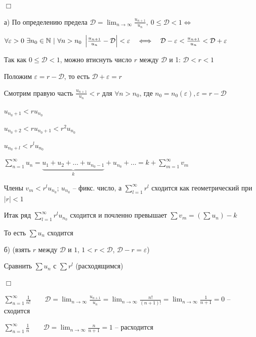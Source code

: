 \documentclass[12pt]{article}
\begin{document}
    \begin{MyProof}
        $\Box$

        а) По определению предела $\mathcal{D} = \lim_{n \to \infty} \frac{u_{n + 1}}{u_n}, \ 0 \leq \mathcal{D} < 1 \Longleftrightarrow$

        $\forall \varepsilon > 0 \ \exists n_0 \in \mathbb{N} \ | \ \forall n > n_0 \ \left|\frac{u_{n + 1}}{u_n} - \mathcal{D}\right| < \varepsilon \quad \Longleftrightarrow \quad \mathcal{D} - \varepsilon < \frac{u_{n + 1}}{u_n} < \mathcal{D} + \varepsilon$

        Так как $0 \leq \mathcal{D} < 1$, можно втиснуть число $r$ между $\mathcal{D}$ и 1: $\mathcal{D} < r < 1$

        Положим $\varepsilon = r - \mathcal{D}$, то есть $\mathcal{D} + \varepsilon = r$

        Смотрим правую часть $\frac{u_{n + 1}}{u_n} < r$ для $\forall n > n_0$, где $n_0 = n_0(\varepsilon), \varepsilon = r - \mathcal{D}$

        $u_{n_0 + 1} < r u_{n_0}$

        $u_{n_0 + 2} < r u_{n_0 + 1} < r^2 u_{n_0}$

        $u_{n_0 + l} < r^l u_{n_0}$

        $\sum_{n = 1}^\infty u_n = \underset{k}{\underbrace{u_1 + u_2 + \dots + u_{n_0 - 1}}} + u_{n_0} + \dots = k + \sum_{m = 1}^\infty v_m $ %

        Члены $v_m < r^l u_{n_0}$; $u_{n_0}$ -- фикс. число, а $\sum_{l = 1}^\infty r^l$ сходится как геометрический при $|r| < 1$

        Итак ряд $\sum_{l = 1}^\infty r^l u_{n_0}$ сходится и почленно превышает $\sum v_m = \left(\sum u_n\right) - k$

        То есть $\sum u_n$ сходится

        б) \Lab (взять $r$ между $\mathcal{D}$ и $1$, $1 < r < \mathcal{D}$, $\mathcal{D} - r = \varepsilon$)

        Сравнить $\sum u_n$ с $\sum r^l$ (расходящимся)

        $\Box$
    \end{MyProof}

     $\sum_{n = 1}^\infty \frac{1}{n!} \quad\quad \mathcal{D} = \lim_{n \to \infty} \frac{u_{n + 1}}{u_n} = \lim_{n \to \infty} \frac{n!}{(n + 1)!} = \lim_{n \to \infty} \frac{1}{n + 1} = 0$ -- сходится

     $\sum_{n = 1}^\infty \frac{1}{n} \quad\quad \mathcal{D} = \lim_{n \to \infty} \frac{n}{n + 1} = 1$ -- расходится
\end{document}
